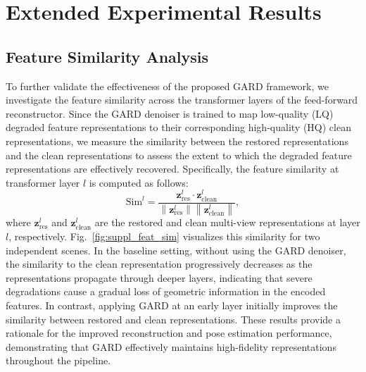 \section{Extended Experimental Results}

\subsection{Feature Similarity Analysis}
To further validate the effectiveness of the proposed GARD framework, we investigate the feature similarity across the transformer layers of the feed-forward reconstructor. Since the GARD denoiser is trained to map low-quality (LQ) degraded feature representations to their corresponding high-quality (HQ) clean representations, we measure the similarity between the restored representations and the clean representations to assess the extent to which the degraded feature representations are effectively recovered. Specifically, the feature similarity at transformer layer $l$ is computed as follows:
\begin{equation}
\mathrm{Sim}^{l} = 
\frac{
\mathbf{z}_{\text{res}}^{l}
\cdot 
\mathbf{z}_{\text{clean}}^{l}
}{
\left\lVert \mathbf{z}_{\text{res}}^{l} \right\rVert
\left\lVert \mathbf{z}_{\text{clean}}^{l} \right\rVert
},
\end{equation}
where $\mathbf{z}_{\text{res}}^{l}$ and $\mathbf{z}_{\text{clean}}^{l}$ are the restored and clean multi-view representations at layer $l$, respectively. Fig.~\ref{fig:suppl_feat_sim} visualizes this similarity for two independent scenes. In the baseline setting, without using the GARD denoiser, the similarity to the clean representation progressively decreases as the representations propagate through deeper layers, indicating that severe degradations cause a gradual loss of geometric information in the encoded features. In contrast, applying GARD at an early layer initially improves the similarity between restored and clean representations. These results provide a rationale for the improved reconstruction and pose estimation performance, demonstrating that GARD effectively maintains high-fidelity representations throughout the pipeline.



